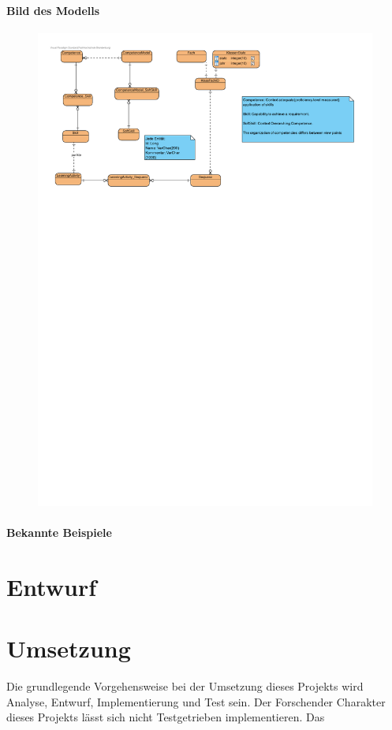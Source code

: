 \documentclass[
12pt,
english,
ngerman,
headsepline,
twoside,
openright,
numbers=noenddot,version=first
]{scrreprt}
\begin{document}
\paragraph{Bild des Modells}
\begin{figure}
	\includegraphics[scale=0.5]{./pics/koma-er-physical.pdf}
\end{figure}

\paragraph{Bekannte Beispiele}

\section{Entwurf}
\label{chap:design}

\section{Umsetzung}
\label{chap:impl}
Die grundlegende Vorgehensweise bei der Umsetzung dieses Projekts wird Analyse, Entwurf, Implementierung und Test sein. Der Forschender Charakter dieses Projekts lässt sich nicht Testgetrieben implementieren.
Das
\end{document}
